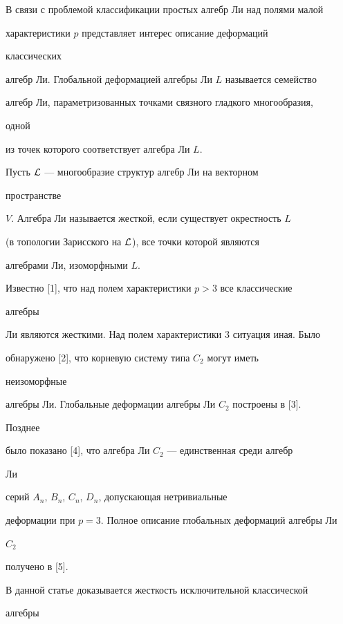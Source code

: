 \label{begin}  


 


В связи с проблемой классификации простых алгебр Ли над полями малой 


характеристики $p$ представляет интерес описание деформаций 


классических 


алгебр Ли. Глобальной деформацией алгебры Ли $L$ называется семейство 


алгебр Ли, параметризованных точками связного гладкого многообразия, 


одной 


из точек которого соответствует алгебра Ли $L$. 


Пусть $\cal L$ --- многообразие структур алгебр Ли на векторном 


пространстве 


$V$. Алгебра Ли называется жесткой, если существует окрестность $L$ 


(в топологии Зарисского на $\cal L$), все точки которой являются 


алгебрами Ли, изоморфными $L$. 


 


Известно [1], что над полем характеристики $p>3$ все классические 


алгебры 


Ли являются жесткими. Над полем характеристики 3 ситуация иная. Было 


обнаружено [2], что корневую систему типа $C_2$ могут иметь 


неизоморфные 


алгебры Ли. Глобальные деформации алгебры Ли $C_2$ построены в [3]. 


Позднее 


было показано [4], что алгебра Ли $C_2$ --- единственная среди алгебр 


Ли 


серий $A_n$, $B_n$, $C_n$, $D_n$, допускающая нетривиальные 


деформации при $p=3$. Полное описание глобальных деформаций алгебры Ли 


$C_2$ 


получено в [5]. 


 


В данной статье доказывается жесткость исключительной классической 


алгебры 


